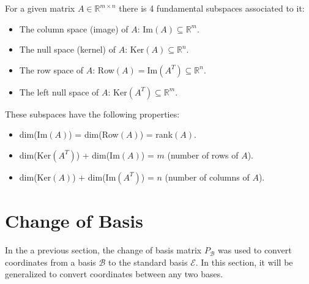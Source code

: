 For a given matrix $A \in \mathbb{R}^{m \times n}$ there is 4 fundamental subspaces associated to it:
\begin{itemize}[itemsep=1pt,label=$\circ$]
    \item The column space (image) of $A$: Im$(A) \subseteq \mathbb{R}^m$.
    \item The null space (kernel) of $A$: Ker$(A) \subseteq \mathbb{R}^n$.
    \item The row space of $A$: Row$(A) = \text{Im}(A^T) \subseteq \mathbb{R}^n$.
    \item The left null space of $A$: Ker$(A^T) \subseteq \mathbb{R}^m$.
\end{itemize}
These subspaces have the following properties:
\begin{itemize}[itemsep=1pt,label=$\circ$]
    \item dim(Im$(A)$) = dim(Row$(A)$) = rank$(A)$.
    \item dim(Ker$(A^T)$) + dim(Im$(A)$) = $m$ (number of rows of $A$).
    \item dim(Ker$(A)$) + dim(Im$(A^T)$) = $n$ (number of columns of $A$).
\end{itemize}

\section{Change of Basis}
In the a previous section, the change of basis matrix $P_{\mathcal{B}}$ was used to convert coordinates from a basis $\mathcal{B}$ to the standard basis $\mathcal{E}$. In this section, it will be generalized to convert coordinates between any two bases.

